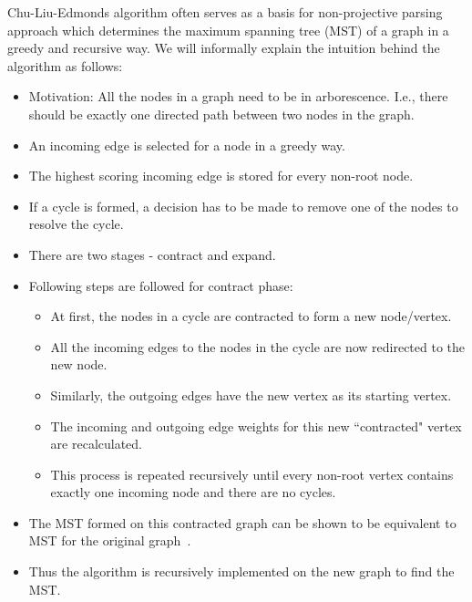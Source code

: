 Chu-Liu-Edmonds algorithm\citep{chu1965shortest,edmonds1967optimum} often serves as a basis for non-projective parsing approach which determines the maximum spanning tree (MST) of a graph in a greedy and recursive way. We will informally explain the intuition behind the algorithm as follows:
\begin{itemize}[label={--}]
\item{Motivation: } All the nodes in a graph need to be in arborescence. I.e., there should be exactly one directed path between two nodes in the graph.
\item An incoming edge is selected for a node in a greedy way.
\item The highest scoring incoming edge is stored for every non-root node.
\item If a cycle is formed, a decision has to be made to remove one of the nodes to resolve the cycle. 
\item There are two stages - contract and expand. 
\item Following steps are followed for contract phase:
\begin{itemize}[label=$\diamond$]
\item At first, the nodes in a cycle are contracted to form a new node/vertex.
\item All the incoming edges to the nodes in the cycle are now redirected to the new node.
\item Similarly, the outgoing edges have the new vertex as its starting vertex.
\item  The incoming and outgoing edge weights for this new ``contracted" vertex are recalculated.
\item This process is repeated recursively until every non-root vertex contains exactly one incoming node and there are no cycles.  
\end{itemize}
\item The MST formed on this contracted graph can be shown to be equivalent to MST for the original graph~\citep{georgiadis2003arborescence}.
\item Thus the algorithm is recursively implemented on the new graph to find the MST.
\end{itemize}


